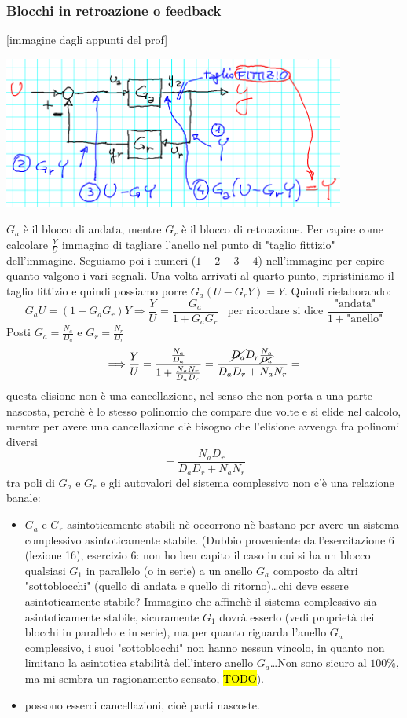 \subsubsection{Blocchi in retroazione o feedback}
[immagine dagli appunti del prof]
\begin{center}
    \includegraphics[height=5cm]{../lezione11/img5.PNG}
\end{center}
$G_a$ è il blocco di andata, mentre $G_r$ è il blocco di retroazione.\newline
Per capire come calcolare $\frac{Y}{U}$ immagino di tagliare l'anello nel punto di "taglio fittizio" dell'immagine. Seguiamo poi i numeri ($1-2-3-4$) nell'immagine per capire quanto valgono i vari segnali. Una volta arrivati al quarto punto, ripristiniamo il taglio fittizio e quindi possiamo porre $G_a(U-G_r Y) = Y$. Quindi rielaborando:
\[
    G_a U = (1+G_aG_r)Y \Longrightarrow \frac{Y}{U} = \frac{G_a}{1 + G_a G_r} \;\;\;\text{per ricordare si dice $\frac{\text{"andata"}}{1+ \text{"anello"}}$}
\]
Posti $G_a = \frac{N_a}{D_a}$ e $G_r = \frac{N_r}{D_r}$
\[
    \Longrightarrow \frac{Y}{U} = \frac{\frac{N_a}{D_a}}{1 + \frac{N_aN_r}{D_aD_r}} = \frac{\cancel{D_a}D_r \frac{N_a}{\cancel{D_a}}}{D_aD_r + N_aN_r}=
\]
questa elisione non è una cancellazione, nel senso che non porta a una parte nascosta, perchè è lo stesso polinomio che compare due volte e si elide nel calcolo, mentre per avere una cancellazione c'è bisogno che l'elisione avvenga fra polinomi diversi
\[
    = \frac{N_aD_r}{D_aD_r +N_aN_r}
\]
tra poli di $G_a$ e $G_r$ e gli autovalori del sistema complessivo non c'è una relazione banale:
\begin{itemize}
    \item $G_a$ e $G_r$ asintoticamente stabili nè occorrono nè bastano per avere un sistema complessivo asintoticamente stabile. (Dubbio proveniente dall'esercitazione 6 (lezione 16), esercizio 6: non ho ben capito il caso in cui si ha un blocco qualsiasi $G_1$ in parallelo (o in serie) a un anello $G_a$ composto da altri "sottoblocchi" (quello di andata e quello di ritorno)\dots chi deve essere asintoticamente stabile? Immagino che affinchè il sistema complessivo sia asintoticamente stabile, sicuramente $G_1$ dovrà esserlo (vedi proprietà dei blocchi in parallelo e in serie), ma per quanto riguarda l'anello $G_a$ complessivo, i suoi "sottoblocchi" non hanno nessun vincolo, in quanto non limitano la asintotica stabilità dell'intero anello $G_a$\dots Non sono sicuro al $100\%$, ma mi sembra un ragionamento sensato, \hl{TODO}).
    \item possono esserci cancellazioni, cioè parti nascoste.
\end{itemize}
